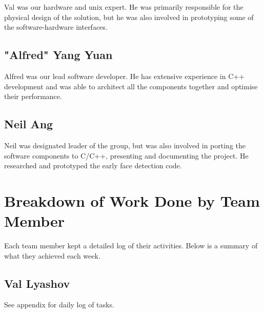\documentclass[11pt,a4paper,titlepage]{report}
\begin{document}
Val was our hardware and unix expert. He was primarily responsible for the physical design of the solution, but he was also involved in prototyping some of the software-hardware interfaces.

\subsection{"Alfred" Yang Yuan}

Alfred was our lead software developer. He has extensive experience in C++ development and was able to architect all the components together and optimise their performance.

\subsection{Neil Ang}

Neil was designated leader of the group, but was also involved in porting the software components to C/C++, presenting and documenting the project. He researched and prototyped the early face detection code.


\section{Breakdown of Work Done by Team Member}

Each team member kept a detailed log of their activities. Below is a summary of what they achieved each week.

\subsection{Val Lyashov}

See appendix for daily log of tasks.
\end{document}
